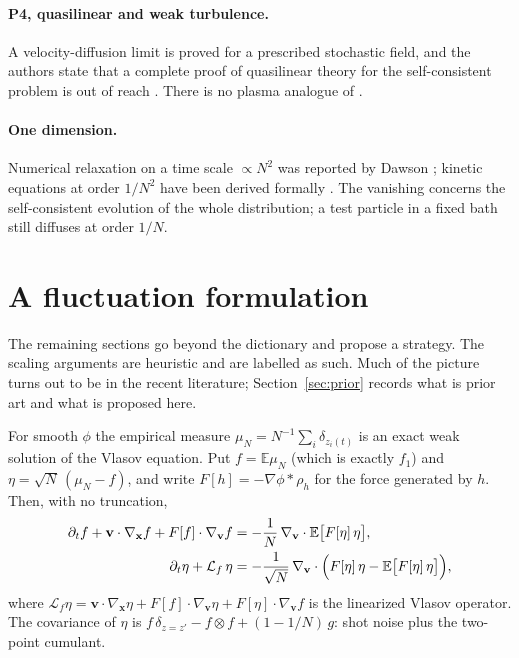 \documentclass[11pt]{article}
\newcommand{\bx}{\mathbf{x}}
\newcommand{\bv}{\mathbf{v}}
\theoremstyle{definition}
\begin{document}
\paragraph{P4, quasilinear and weak turbulence.} A velocity-diffusion limit
is proved for a prescribed stochastic field, and the authors state that a
complete proof of quasilinear theory for the self-consistent problem is out
of reach \cite{BardosBesse}. There is no plasma analogue of
\cite{DH-WKE,DH-long}.

\paragraph{One dimension.} Numerical relaxation on a time scale $\propto N^2$
was reported by Dawson \cite{Dawson}; kinetic equations at order $1/N^2$ have
been derived formally \cite{Fouvry}. The vanishing concerns the
self-consistent evolution of the whole distribution; a test particle in a
fixed bath still diffuses at order $1/N$.

\section{A fluctuation formulation}
\label{sec:fluct}

The remaining sections go beyond the dictionary and propose a strategy. The
scaling arguments are heuristic and are labelled as such. Much of the
picture turns out to be in the recent literature; Section~\ref{sec:prior}
records what is prior art and what is proposed here.

For smooth $\phi$ the empirical measure
$\mu_N = N^{-1}\sum_i \delta_{z_i(t)}$ is an exact weak solution of the Vlasov
equation. Put $f = \mathbb{E}\mu_N$ (which is exactly $f_1$) and
$\eta = \sqrt{N}\,(\mu_N - f)$, and write $F[h] = -\nabla\phi * \rho_h$ for
the force generated by $h$. Then, with no truncation,
\begin{align}
  \partial_t f + \bv\cdot\nabla_{\bx} f + F[f]\cdot\nabla_{\bv} f
    &= -\frac{1}{N}\,\nabla_{\bv}\cdot\mathbb{E}\bigl[F[\eta]\,\eta\bigr],
    \label{eq:mean}\\
  \partial_t \eta + \mathcal{L}_f\,\eta
    &= -\frac{1}{\sqrt{N}}\,\nabla_{\bv}\cdot
       \Bigl(F[\eta]\,\eta - \mathbb{E}\bigl[F[\eta]\,\eta\bigr]\Bigr),
    \label{eq:fluct}
\end{align}
where $\mathcal{L}_f\eta = \bv\cdot\nabla_{\bx}\eta + F[f]\cdot\nabla_{\bv}\eta
+ F[\eta]\cdot\nabla_{\bv} f$ is the linearized Vlasov operator. The
covariance of $\eta$ is
$f\,\delta_{z=z'} - f\otimes f + (1 - 1/N)\,g$: shot noise plus the two-point
cumulant.
\end{document}
